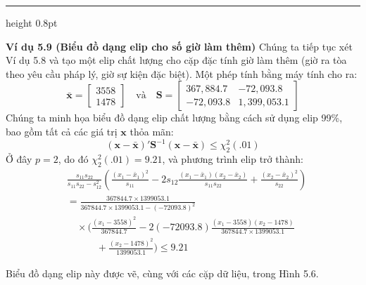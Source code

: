 \hrule height 0.8pt
\vspace{0.8em}

\noindent\textbf{Ví dụ 5.9 (Biểu đồ dạng elip cho số giờ làm thêm)} Chúng ta tiếp tục xét Ví dụ 5.8 và tạo một elip chất lượng cho cặp đặc tính giờ làm thêm (giờ ra tòa theo yêu cầu pháp lý, giờ sự kiện đặc biệt). Một phép tính bằng máy tính cho ra:
\[
\bar{\mathbf{x}} = \begin{bmatrix} 3558 \\ 1478 \end{bmatrix} \quad \text{và} \quad \mathbf{S} = \begin{bmatrix} 367{,}884.7 & -72{,}093.8 \\ -72{,}093.8 & 1{,}399{,}053.1 \end{bmatrix}
\]
Chúng ta minh họa biểu đồ dạng elip chất lượng bằng cách sử dụng elip 99\%, bao gồm tất cả các giá trị $\mathbf{x}$ thỏa mãn:
\[
(\mathbf{x} - \bar{\mathbf{x}})'\mathbf{S}^{-1}(\mathbf{x} - \bar{\mathbf{x}}) \le \chi_2^2(.01)
\]
Ở đây $p = 2$, do đó $\chi_2^2(.01) = 9.21$, và phương trình elip trở thành:
\begin{align*}
&\frac{s_{11}s_{22}}{s_{11}s_{22} - s_{12}^2}\left( \frac{(x_1 - \bar{x}_1)^2}{s_{11}} - 2s_{12}\frac{(x_1 - \bar{x}_1)(x_2 - \bar{x}_2)}{s_{11}s_{22}} + \frac{(x_2 - \bar{x}_2)^2}{s_{22}} \right) \\
&= \frac{367844.7 \times 1399053.1}{367844.7 \times 1399053.1 - (-72093.8)^2} \\
&\quad \times \Biggl( \frac{(x_1 - 3558)^2}{367844.7} - 2(-72093.8)\frac{(x_1 - 3558)(x_2 - 1478)}{367844.7 \times 1399053.1} \\
&\qquad\quad + \frac{(x_2 - 1478)^2}{1399053.1} \Biggr) \le 9.21
\end{align*}

Biểu đồ dạng elip này được vẽ, cùng với các cặp dữ liệu, trong Hình 5.6.

\vspace{0.8em}


